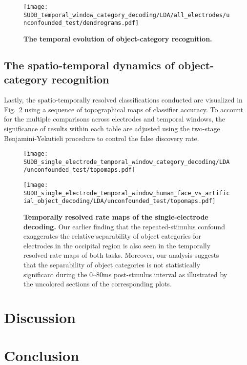 \begin{figure}[b]
    \centering
    \texttt{[image: SUDB\_temporal\_window\_category\_decoding/LDA/all\_electrodes/unconfounded\_test/dendrograms.pdf]}        
    \caption{\textbf{The temporal evolution of object-category recognition.}\label{fig:category-temporal-dendrograms}}
\end{figure}

\subsection{The spatio-temporal dynamics of object-category recognition}
Lastly, the spatio-temporally resolved classifications conducted are visualized in Fig.~\ref{fig:category-spatiotemporal} using a sequence of topographical maps of classifier accuracy. To account for the multiple comparisons across electrodes and temporal windows, the significance of results within each table are adjusted using the two-stage Benjamini-Yekutieli procedure to control the false discovery rate.

\begin{figure} 
    \centering
    \begin{minipage}{\columnwidth} 
        \texttt{[image: SUDB\_single\_electrode\_temporal\_window\_category\_decoding/LDA/unconfounded\_test/topomaps.pdf]}   
    \end{minipage}
    \hfill
    \begin{minipage}{\columnwidth} 
        \texttt{[image: SUDB\_single\_electrode\_temporal\_window\_human\_face\_vs\_artificial\_object\_decoding/LDA/unconfounded\_test/topomaps.pdf]}  
    \end{minipage}
    
          
    \caption{\textbf{Temporally resolved rate maps of the single-electrode decoding.} Our earlier finding that the repeated-stimulus confound exaggerates the relative separability of object categories for electrodes in the occipital region is also seen in the temporally resolved rate maps of both tasks. Moreover, our analysis suggests that the separability of object categories is not statistically significant during the 0--80ms post-stmulus interval as illustrated by the uncolored sections of the corresponding plots.\label{fig:category-spatiotemporal}}
\end{figure}


\section{Discussion}


\section{Conclusion}